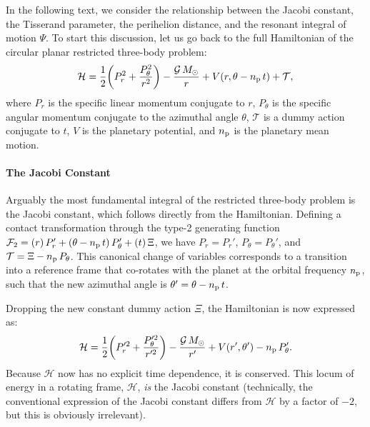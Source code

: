 \documentclass[twocolumn]{aastex62}
\newcommand{\G}{\mathcal{G}}
\newcommand{\Msun}{M_{\odot}}
\newcommand{\Ham}{\mathcal{H}}
\begin{document}
\begin{appendix} \label{sec:app}

In the following text, we consider the relationship between the Jacobi constant, the Tisserand parameter, the perihelion distance, and the resonant integral of motion $\Psi$. To start this discussion, let us go back to the full Hamiltonian of the circular planar restricted three-body problem: 
\begin{align}
\Ham=\frac{1}{2}\bigg(P_r^2+\frac{P_{\theta}^2}{r^2} \bigg)-\frac{\G\,\Msun}{r}+V(r,\theta-n_{\rm{p}}\,t)+\mathcal{T},
\end{align}
where $P_r$ is the specific linear momentum conjugate to $r$, $P_{\theta}$ is the specific angular momentum conjugate to the azimuthal angle $\theta$, $\mathcal{T}$ is a dummy action conjugate to $t$, $V$ is the planetary potential, and $n_{\rm{p}}$ is the planetary mean motion. 

\paragraph{The Jacobi Constant} Arguably the most fundamental integral of the restricted three-body problem is the Jacobi constant, which follows directly from the Hamiltonian. Defining a contact transformation through the type-2 generating function $\mathcal{F}_2=(r)\,P_{r}'+(\theta-n_{\rm{p}}\,t)\,P_{\theta}'+(t)\,\Xi$, we have $P_r=P_r'$, $P_{\theta}=P_{\theta}'$, and $\mathcal{T}=\Xi-n_{\rm{p}}\,P_{\theta}$. This canonical change of variables corresponds to a transition into a reference frame that co-rotates with the planet at the orbital frequency $n_{\rm{p}}$, such that the new azimuthal angle is $\theta'=\theta-n_{\rm{p}}\,t$. 

Dropping the new constant dummy action $\Xi$, the Hamiltonian is now expressed as:
\begin{align}
\Ham=\frac{1}{2}\bigg(P_r'^2+\frac{P_{\theta}'^2}{r'^2} \bigg)-\frac{\G\,\Msun}{r'}+V(r',\theta')-n_{\rm{p}}\,P_{\theta}'.
\end{align}
Because $\Ham$ now has no explicit time dependence, it is conserved. This locum of energy in a rotating frame, $\Ham$, \textit{is} the Jacobi constant (technically, the conventional expression of the Jacobi constant differs from $\Ham$ by a factor of $-2$, but this is obviously irrelevant).


\end{appendix}
\end{document}
